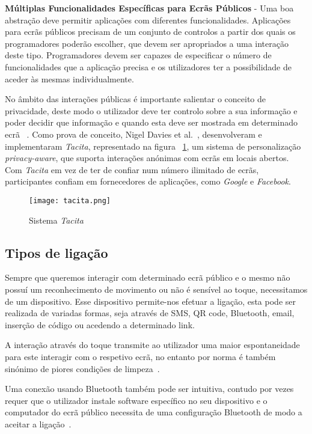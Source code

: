 \textbf{Múltiplas Funcionalidades Específicas para Ecrãs Públicos} - Uma boa abstração deve permitir aplicações com diferentes funcionalidades. Aplicações para ecrãs públicos precisam de um conjunto de controlos a partir dos quais os programadores poderão escolher, que devem ser apropriados a uma interação deste tipo. Programadores devem ser capazes de especificar o número de funcionalidades que a aplicação precisa e os utilizadores ter a possibilidade de aceder às mesmas individualmente.

No âmbito das interações públicas é importante salientar o conceito de privacidade, deste modo o utilizador deve ter controlo sobre a sua informação e poder decidir que informação e quando esta deve ser mostrada em determinado ecrã ~\cite{Davies2012b}. Como prova de conceito, Nigel Davies et al.~\cite{Davies2012b}, desenvolveram e implementaram \textit{Tacita}, representado na figura ~\ref{fig:tacita}, um sistema de personalização \textit{privacy-aware}, que suporta interações anónimas com ecrãs em locais abertos. Com \textit{Tacita} em vez de ter de confiar num número ilimitado de ecrãs, participantes confiam em fornecedores de aplicações, como \textit{Google} e \textit{Facebook}.

\begin{figure}[h]
\centering
\texttt{[image: tacita.png]}
\caption[Sistema \textit{Tacita}] {Sistema \textit{Tacita} ~\cite{Davies2012b}}
\label{fig:tacita}
\end{figure}

\subsection{Tipos de ligação}

Sempre que queremos interagir com determinado ecrã público e o mesmo não possuí um reconhecimento de movimento ou não é sensível ao toque, necessitamos de um dispositivo. Esse dispositivo permite-nos efetuar a ligação, esta pode ser realizada de variadas formas, seja através de SMS, QR code, Bluetooth, email, inserção de código ou acedendo a determinado link.

A interação através do toque transmite ao utilizador uma maior espontaneidade para este interagir com o respetivo ecrã, no entanto por norma é também sinónimo de piores condições de limpeza~\cite{Ballagas}.

Uma conexão usando Bluetooth também pode ser intuitiva, contudo por vezes requer que o utilizador instale software específico no seu dispositivo e o computador do ecrã público necessita de uma configuração Bluetooth de modo a aceitar a ligação~\cite{Ballagas}.

